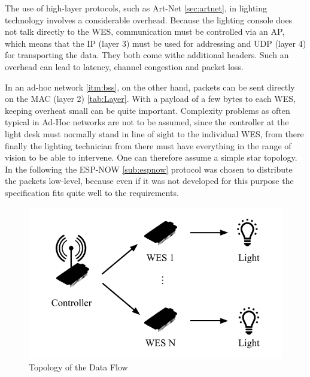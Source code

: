The use of high-layer protocols, such as Art-Net \cref{sec:artnet}, in lighting technology involves a considerable overhead. 
Because the lighting console does not talk directly to the \ac{WES}, communication must be controlled via an \ac{AP}, 
which means that the \ac{IP} (layer 3) must be used for addressing and \ac{UDP} (layer 4) for transporting the data. 
They both come withe additional headers. 
Such an overhead can lead to latency, channel congestion and packet loss.
 
In an ad-hoc network \cref{itm:bss}, on the other hand, packets can be sent directly on the MAC (layer 2) \cref{tab:Layer}. 
With a payload of a few bytes to each WES, keeping overheat small can be quite important. 
Complexity problems as often typical in Ad-Hoc networks are not to be assumed, 
since the controller at the light desk must normally stand in line of sight to the individual WES, 
from there finally the lighting technician from there must have everything in the range of vision to be able to intervene. 
One can therefore assume a simple star topology.
In the following the ESP-NOW \cref{sub:espnow} protocol was chosen to distribute the packets low-level, 
because even if it was not developed for this purpose the specification fits quite well to the requirements.

\begin{figure}[h]
	\centering
	\includegraphics[scale=0.75]{figures/dataFlow.pdf}
	\caption{Topology of the Data Flow}
	\label{fig:testbed}
\end{figure}

